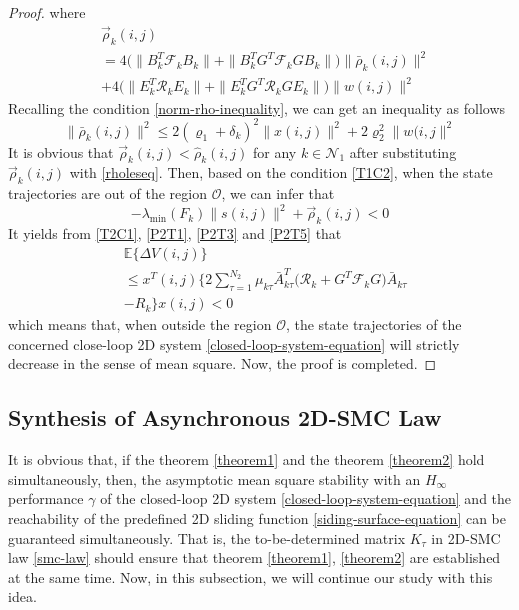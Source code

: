 \documentclass[journal,final,twocolumn]{IEEEtran}
\begin{document}
\begin{proof}
	where
	\begin{equation*}
		\begin{split}
			&\vec{\rho}_{k}(i,j)\\
			&= 4\big(\|B^{T}_{k}\mathcal{F}_{k}B_{k}\|+ \|B^{T}_{k}G^{T}\mathcal{F}_{k}GB_{k}\|\big) \|\bar{\rho}_{k}(i,j)\|^{2} \\
			&+ 4\big(\|E^{T}_{k}\mathcal{R}_{k}E_{k}\|+ \|E^{T}_{k}G^{T}\mathcal{R}_{k}GE_{k}\|\big) \|w(i,j)\|^{2} 
		\end{split}
	\end{equation*}
	Recalling the condition \eqref{norm-rho-inequality}, we can get an inequality as follows
	\begin{equation}\label{rholeseq}
		\|\bar{\rho}_{k}(i,j)\|^{2} \leq 2(\varrho_{1}+\delta_{k})^{2}\|x(i,j)\|^{2} +2\varrho_{2}^{2}\|w(i,j\|^{2} 
	\end{equation}	  
	It is obvious that $\vec{\rho}_{k}(i,j) < \hat{\rho}_{k}(i,j) $ for any $k\in\mathcal{N}_{1}$ after substituting $\vec{\rho}_{k}(i,j)$ with \eqref{rholeseq}. 
	Then, based on the condition \eqref{T1C2}, when the state trajectories are out of the region $\mathcal{O}$, we can infer that
	\begin{equation}\label{P2T5}
		-\lambda_{\mathrm{min}}(F_{k})\|s(i,j)\|^{2} + \vec{\rho}_{k}(i,j) <0
	\end{equation}
	It yields from \eqref{T2C1}, \eqref{P2T1}, \eqref{P2T3} and \eqref{P2T5} that 
	\begin{equation}
		\begin{split}
			&\mathbb{E}\{\varDelta V(i,j) \}\\
			&\leq x^{T}(i,j)\Big\{ 2\sum_{\tau =1}^{N_{2}}\mu_{k\tau }\bar{A}^{T}_{k\tau }\big(\mathcal{R}_{k} +G^{T}\mathcal{F}_{k}G \big)\bar{A}_{k\tau }\\ &-R_{k} \Big\} x(i,j)<0
		\end{split}
	\end{equation}
	which means that, when outside the region $\mathcal{O}$,  the state trajectories of the concerned close-loop 2D system \eqref{closed-loop-system-equation} will strictly decrease in the sense of mean square. Now, the proof is completed.
	 
\end{proof}

 
\subsection{  Synthesis of Asynchronous 2D-SMC Law }\label{smc-law-synthesis} 
It is obvious that, if the theorem \ref{theorem1} and the theorem \ref{theorem2} hold simultaneously, then, the asymptotic mean square stability  with an $H_{\infty}$  performance $\gamma$ of the closed-loop 2D system \eqref{closed-loop-system-equation} and the reachability of the predefined 2D sliding function \eqref{siding-surface-equation} can be guaranteed simultaneously. That is, the to-be-determined matrix $K_{\tau }$ in 2D-SMC law \eqref{smc-law} should ensure that theorem \ref{theorem1}, \ref{theorem2} are established at the same time. Now, in this subsection, we will continue our study with this idea.
\end{document}
